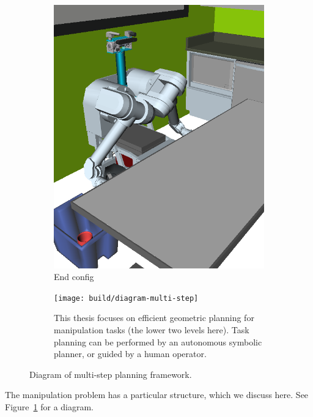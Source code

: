 {\begin{figure}
\begin{widepage}
\begin{subfigure}[t]{0.19\linewidth}
      \includegraphics[width=\columnwidth]{figs/testherb-e.png}
      \caption{End config}
   \end{subfigure}

   \vspace{0.3cm}

   \begin{subfigure}[t]{\linewidth}
      \centering
      \texttt{[image: build/diagram-multi-step]}
      \caption{This thesis focuses on efficient geometric planning
         for manipulation tasks (the lower two levels here).
         Task planning can be performed by an autonomous
         symbolic planner,
         or guided by a human operator.}
   \end{subfigure}

   \caption{Diagram of multi-step planning framework.}
   \label{fig:diagram-multi-step}
\end{widepage}
\end{figure}
}

The manipulation problem has a particular structure,
which we discuss here.
See Figure~\ref{fig:diagram-multi-step}
for a diagram.

